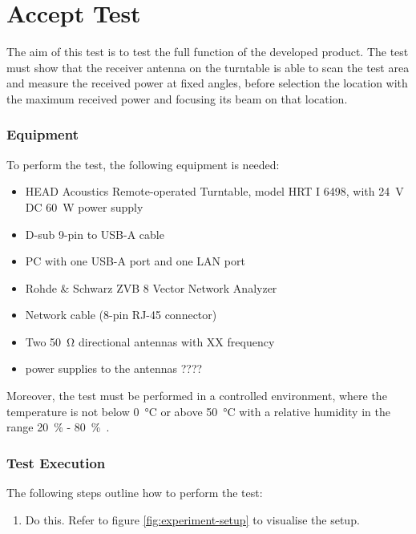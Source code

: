 \section{Accept Test}
The aim of this test is to test the full function of the developed product. The test must show that the receiver antenna on the turntable is able to scan the test area and measure the received power at fixed angles, before selection the location with the maximum received power and focusing its beam on that location.

\subsubsection{Equipment}
To perform the test, the following equipment is needed:

\begin{itemize}
    \item HEAD Acoustics Remote-operated Turntable, model HRT I 6498, with \SI{24}{\volt} DC \SI{60}{W} power supply
    \item D-sub 9-pin to USB-A cable
    \item PC with one USB-A port and one LAN port
    \item Rohde \& Schwarz ZVB 8 Vector Network Analyzer
    \item Network cable (8-pin RJ-45 connector)
    \item Two \SI{50}{\ohm} directional antennas with XX frequency
    \item power supplies to the antennas ????
\end{itemize}

Moreover, the test must be performed in a controlled environment, where the temperature is not below \SI{0}{\celsius} or above \SI{50}{\celsius} with a relative humidity in the range \SI{20}{\percent} - \SI{80}{\percent}~\cite{hrt_i_data_sheet}.

\subsubsection{Test Execution}
The following steps outline how to perform the test:

\begin{enumerate}
    \item Do this. Refer to figure \ref{fig:experiment-setup} to visualise the setup.
\end{enumerate}

